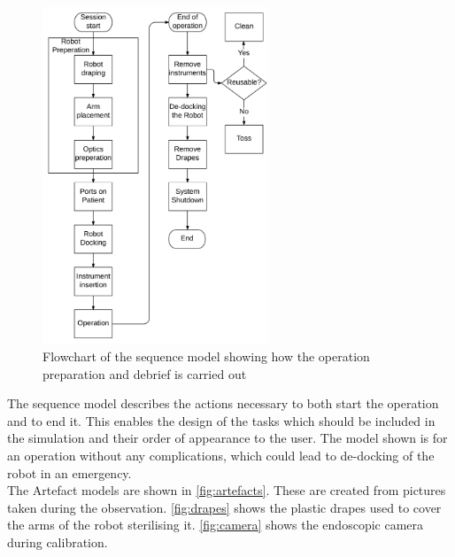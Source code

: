 \documentclass[paper=a4, fontsize=11pt]{scrartcl} %
\numberwithin{equation}{section} %
\numberwithin{figure}{section} %
\numberwithin{table}{section} %
\begin{document}
\begin{figure}[hbpt]
	\centering
	\includegraphics[width=0.6\textwidth]{sequencemodel}
	\caption{Flowchart of the sequence model showing how the operation preparation and debrief is carried out}
	\label{fig:sequence}
\end{figure}

The sequence model describes the actions necessary to both start the operation and to end it. This enables the design of the tasks which should be included in the simulation and their order of appearance to the user.
The model shown is for an operation without any complications, which could lead to de-docking of the robot in an emergency.\\


The Artefact models are shown in \autoref{fig:artefacts}. These are created from pictures taken during the observation. \autoref{fig:drapes} shows the plastic drapes used to cover the arms of the robot sterilising it. \autoref{fig:camera} shows the endoscopic camera during calibration.
\end{document}
